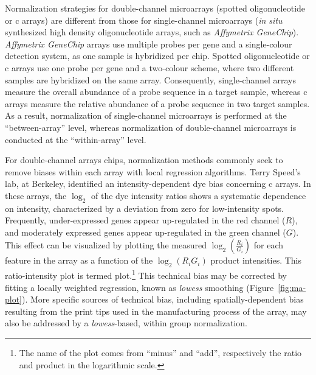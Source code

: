 Normalization strategies for double-channel microarrays (spotted oligonucleotide
or c arrays\cite{schena_quantitative_1995}) are different from
those for single-channel microarrays (\emph{in situ} synthesized high density
oligonucleotide arrays,\cite{lockhart_expression_1996} such as \emph{Affymetrix
  GeneChip}).  \emph{Affymetrix GeneChip} arrays use multiple probes per gene
and a single-colour detection system, as one sample is hybridized per chip.
Spotted oligonucleotide or c arrays use one probe per gene and a
two-colour scheme, where two different samples are hybridized on the same array.
Consequently, single-channel arrays measure the overall abundance of a probe
sequence in a target sample, whereas c arrays measure the
relative abundance of a probe sequence in two target samples.
As a result, normalization of single-channel microarrays is performed at the
``between-array'' level, whereas normalization of double-channel microarrays is
conducted at the ``within-array'' level.\cite{do_normalization_2006}

For double-channel arrays chips, normalization methods commonly seek to remove
biases within each array with local regression algorithms.  Terry Speed's lab,
at Berkeley, identified an intensity-dependent dye bias concerning
c arrays.  In these arrays, the $\log_2$ of the dye intensity
ratios shows a systematic dependence on intensity, characterized by a deviation
from zero for low-intensity spots.  Frequently, under-expressed genes appear
up-regulated in the red channel ($R$), and moderately expressed genes appear
up-regulated in the green channel ($G$).
This effect can be visualized by plotting the measured
$\log_2(\frac{R_{i}}{G_{i}})$ for each feature in the array as a function of the
$\log_2(R_{i}G_{i})$ product intensities.  This ratio-intensity plot is termed
 plot.\footnote[][-4.5cm]{The name of the plot comes from
  ``minus'' and ``add'', respectively the ratio and product in the logarithmic
  scale.}  This technical bias may be corrected by fitting a locally weighted
regression, known as \emph{lowess} smoothing
(Figure~\ref{fig:ma-plot}).\cite[-4.2cm]{yang_normalization_2001} More specific
sources of technical bias, including spatially-dependent bias resulting from the
print tips used in the manufacturing process of the array, may also be addressed
by a \emph{lowess}-based, within group normalization.

